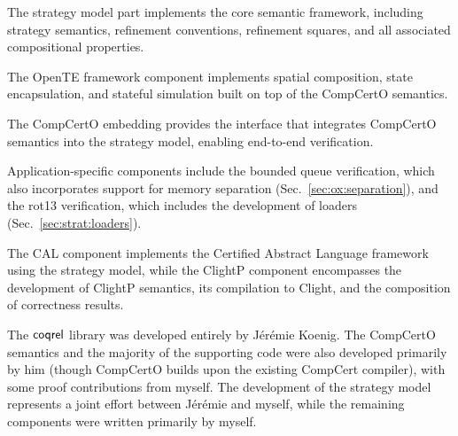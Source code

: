 The strategy model part implements the core semantic framework,
including strategy semantics,
refinement conventions,
refinement squares,
and all associated compositional properties.

The OpenTE framework component implements spatial composition,
state encapsulation,
and stateful simulation built on top of
the CompCertO semantics.

The CompCertO embedding provides
the interface that integrates CompCertO semantics
into the strategy model,
enabling end-to-end verification.

Application-specific components
include the bounded queue verification,
which also incorporates support for memory separation (Sec.~\ref{sec:ox:separation}),
and the rot13 verification,
which includes the development of loaders (Sec.~\ref{sec:strat:loaders}).

The CAL component implements
the Certified Abstract Language framework
using the strategy model,
while the ClightP component encompasses
the development of ClightP semantics,
its compilation to Clight,
and the composition of correctness results.

The $ \mathsf{coqrel} $ library was developed
entirely by Jérémie Koenig.
The CompCertO semantics
and the majority of the supporting code
were also developed primarily by him (though CompCertO builds upon the existing CompCert compiler),
with some proof contributions from myself.
The development of the strategy model
represents a joint effort between Jérémie and myself,
while the remaining components were written primarily by myself.

